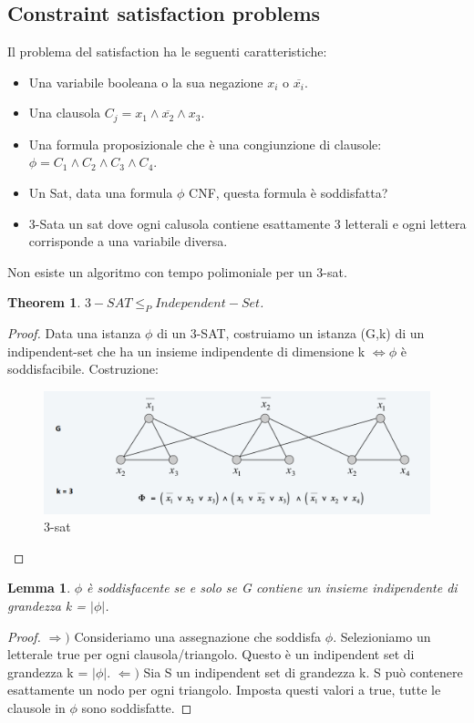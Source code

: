 \documentclass{article}
\newtheorem{theorem}{Theorem}[subsection]
\newtheorem{lemma}{Lemma}[subsection]
\begin{document}
\subsection{Constraint satisfaction problems}
Il problema del satisfaction ha le seguenti caratteristiche:
\begin{itemize}
    \item Una variabile booleana o la sua negazione $x_i \mbox{ o } \overline{x_i}$.
    \item Una clausola $C_j=x_1\land \overline{x_2} \land x_3$.
    \item Una formula proposizionale che è una congiunzione di clausole: $\phi=C_1\land C_2 \land C_3 \land C_4$.
    \item Un Sat, data una formula $\phi$ CNF, questa formula è soddisfatta?
    \item 3-Sata un sat dove ogni calusola contiene esattamente 3 letterali e ogni lettera corrisponde a una variabile diversa.
\end{itemize}
\noindent Non esiste un algoritmo con tempo polimoniale per un 3-sat.
\begin{theorem}
    $3-SAT \leq_P Independent-Set$.
\end{theorem}
\begin{proof}
    Data una istanza $\phi$ di un 3-SAT, costruiamo un istanza (G,k) di un indipendent-set che ha un insieme indipendente di dimensione k $\Leftrightarrow \phi$ è soddisfacibile. Costruzione: 
    \begin{figure}[H]
        \centering
        \includegraphics[width=0.5\linewidth]{Screenshot 2024-05-31 171806.png}
        \caption{3-sat}
        \label{fig:enter-label}
    \end{figure}
\end{proof}
\begin{lemma}
    $\phi$ è soddisfacente se e solo se G contiene un insieme indipendente di grandezza k = $|\phi|$.
\end{lemma}
\begin{proof}
   $\Rightarrow)$ Consideriamo una assegnazione che soddisfa $\phi$. Selezioniamo un letterale true per ogni clausola/triangolo. Questo è un indipendent set di grandezza k = $|\phi|$.
   $\Leftarrow)$ Sia S un indipendent set di grandezza k. S può contenere esattamente un nodo per ogni triangolo. Imposta questi valori a true, tutte le clausole in $\phi$ sono soddisfatte.
\end{proof}
\end{document}
